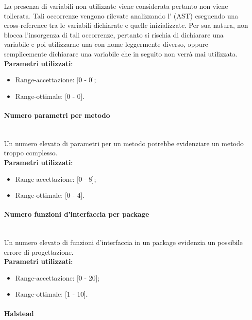 			La presenza di variabili non utilizzate viene considerata  pertanto non viene tollerata. Tali occorrenze vengono rilevate analizzando l' (AST) eseguendo una cross-reference tra le variabili dichiarate e quelle inizializzate. Per sua natura,  non blocca l'insorgenza di tali occorrenze, pertanto si rischia di dichiarare una variabile e poi utilizzarne una con nome leggermente diverso, oppure semplicemente dichiarare una variabile che in seguito non verrà mai utilizzata.\\
			\textbf{Parametri utilizzati}:
			\begin{itemize}
				\item Range-accettazione: [0 - 0];
				\item Range-ottimale: [0 - 0].
			\end{itemize}

			
			\paragraph{Numero parametri per metodo}\mbox{} \\
				
			Un numero elevato di parametri per un metodo potrebbe evidenziare un metodo troppo complesso.\\
			\textbf{Parametri utilizzati}:
			\begin{itemize}
				\item Range-accettazione: [0 - 8];
				\item Range-ottimale: [0 - 4].
			\end{itemize}
			
			
			\paragraph{Numero funzioni d'interfaccia per package}\mbox{} \\
				
			Un numero elevato di funzioni d'interfaccia in un package evidenzia un possibile errore di progettazione.\\
			\textbf{Parametri utilizzati}:
			\begin{itemize}
				\item Range-accettazione: [0 - 20];
				\item Range-ottimale: [1 - 10].
			\end{itemize}

			
			\paragraph{Halstead}\mbox{} \\
			
